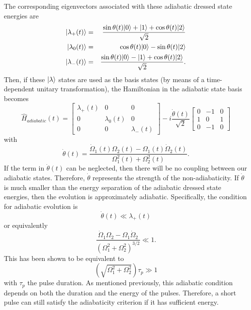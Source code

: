 The corresponding eigenvectors associated with these adiabatic dressed state
energies are
\begin{eqnarray}
\vert \lambda_{+}(t) \rangle &=& \frac{\sin\theta(t)\vert 0 \rangle + \vert 1 \rangle
+\cos\theta(t)\vert 2 \rangle}{\sqrt{2}} \\
\vert \lambda_{0}(t) \rangle &=& \cos\theta(t)\vert 0 \rangle - \sin\theta(t)\vert 2 \rangle \\
\vert \lambda_{-}(t) \rangle &=& \frac{\sin\theta(t)\vert 0 \rangle - \vert 1 \rangle +
\cos\theta(t)\vert 2 \rangle}{\sqrt{2}}.
\end{eqnarray}
Then, if these $\vert \lambda \rangle$ states are used as the basis states (by
means of a time-dependent unitary transformation), the Hamiltonian
in the adiabatic state basis becomes \cite{Khidekel:95}
\begin{equation}
\hat{H}_{adiabatic}(t) = 
\left[ \begin{array}{ccc}
\lambda_+(t) & 0 & 0  \\
0 & \lambda_0(t) & 0 \\
0 & 0 & \lambda_-(t)
\end{array} \right] -i\frac{\dot{\theta}(t)}{\sqrt{2}} 
\left[ \begin{array}{ccc}
0 & -1 & 0  \\
1 & 0 & 1 \\
0 & -1 & 0
\end{array} \right]
\end{equation}
with
\begin{equation}
\dot{\theta}(t) = \frac{\dot{\Omega}_1(t)\Omega_2(t) -
\Omega_1(t)\dot{\Omega}_2(t)}{\Omega_1^2(t) + \Omega_2^2(t)}.
\end{equation}
If the term in $\dot{\theta}(t)$ can be neglected, then there will be no
coupling between our adiabatic states.  Therefore, $\dot{\theta}$ represents
the strength of the non-adiabaticity.  If $\dot{\theta}$ is much
smaller than the energy separation of the adiabatic dressed state energies,
then the evolution is approximately adiabatic.  Specifically, the condition
for adiabatic evolution is
\begin{equation}
\dot{\theta}(t) \ll \lambda_{+}(t)
\end{equation}
or equivalently
\begin{equation}
\frac{\dot{\Omega}_1\Omega_2 -
\Omega_1\dot{\Omega}_2}{\left(\Omega_1^2 + \Omega_2^2\right)^{3/2}} \ll 1.
\end{equation}
This has been shown \cite{Kuklinski:89} to be equivalent to
\begin{equation}
\left(\sqrt{\Omega_1^2 + \Omega_2^2}\right)\tau_p \gg 1
\label{adiab_criterion}
\end{equation}
with $\tau_p$ the pulse duration.  As mentioned previously, this adiabatic
condition depends on both the duration and the energy of the pulses.
Therefore, a short pulse can still satisfy the adiabaticity criterion
if it has sufficient energy.

